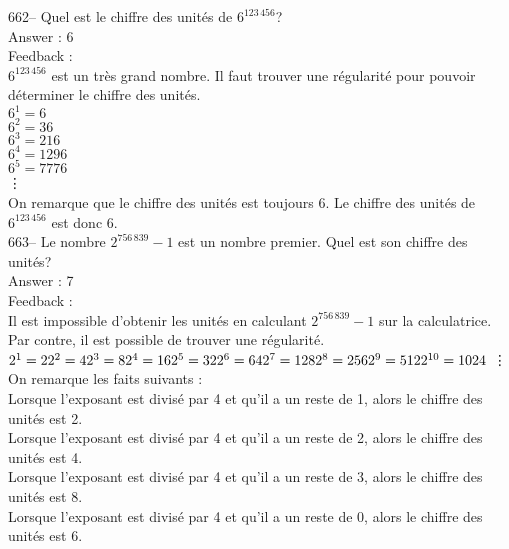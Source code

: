 ﻿\documentclass[letterpaper, 12pt]{article}
\begin{document}
662-- Quel est le chiffre des unit\'es de $6^{123\,456}$?\\

Answer : 6\\

Feedback : \\
$6^{123\,456}$ est un tr\`es grand nombre.  Il faut trouver une
r\'egularit\'e pour pouvoir d\'eterminer le chiffre des unit\'es.\\
$6^{1}=6$\\
$6^{2}=36$\\
$6^{3}=216$\\
$6^{4}=1296$\\
$6^{5}=7776$\\
\vdots\\
On remarque que le chiffre des unit\'es est toujours 6.  Le chiffre des
unit\'es de $6^{123\,456}$ est donc 6.  \\

663--  Le nombre $2^{756\,839}-1$ est un nombre premier.  Quel est son
chiffre des unit\'es?\\

Answer : 7\\

Feedback : \\
Il est impossible d'obtenir les unit\'es en calculant $2^{756\,839}-1$ sur
la calculatrice.  Par contre, il est possible de trouver une r\'egularit\'e.
  \\
$2^{1}  = 2\\
2^{2}  = 4\\
2^{3}  = 8\\
2^{4} = 16\\
2^{5}  = 32\\
2^{6}  = 64\\
2^{7}  = 128\\
2^{8}= 256\\
2^{9}  = 512\\
2^{10} = 1024\\$ \vdots\\
On remarque les faits suivants :\\
Lorsque l'exposant est divis\'e par 4 et qu'il a un reste de 1, alors le
chiffre des unit\'es est 2.\\
Lorsque l'exposant est divis\'e par 4 et qu'il a un reste de 2, alors le
chiffre des unit\'es est 4.\\
Lorsque l'exposant est divis\'e par 4 et qu'il a un reste de 3, alors le
chiffre des unit\'es est 8.\\
Lorsque l'exposant est divis\'e par 4 et qu'il a un reste de 0, alors le
chiffre des unit\'es est 6.\\
\end{document}
